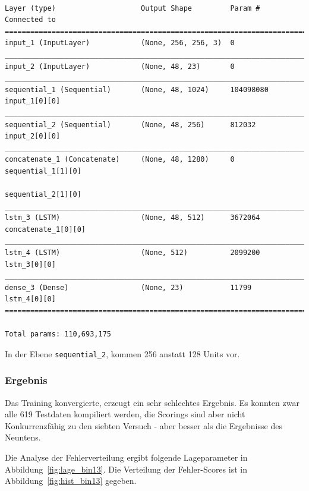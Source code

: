 \documentclass[pdftex,a4paper,halfparskip, article]{scrartcl}
\begin{document}
\begin{verbatim}

Layer (type)                    Output Shape         Param #     Connected to
==============================================================================
input_1 (InputLayer)            (None, 256, 256, 3)  0
______________________________________________________________________________
input_2 (InputLayer)            (None, 48, 23)       0
______________________________________________________________________________
sequential_1 (Sequential)       (None, 48, 1024)     104098080   input_1[0][0]
______________________________________________________________________________
sequential_2 (Sequential)       (None, 48, 256)      812032      input_2[0][0]
______________________________________________________________________________
concatenate_1 (Concatenate)     (None, 48, 1280)     0           sequential_1[1][0]
                                                                 sequential_2[1][0]
______________________________________________________________________________
lstm_3 (LSTM)                   (None, 48, 512)      3672064     concatenate_1[0][0]
______________________________________________________________________________
lstm_4 (LSTM)                   (None, 512)          2099200     lstm_3[0][0]
______________________________________________________________________________
dense_3 (Dense)                 (None, 23)           11799       lstm_4[0][0]
==============================================================================

Total params: 110,693,175
\end{verbatim}

In der Ebene \texttt{sequential\_2}, kommen 256 anstatt 128 Units vor.

\subsubsection*{Ergebnis}

Das Training konvergierte, erzeugt ein sehr schlechtes Ergebnis. Es konnten zwar alle 619 Testdaten kompiliert werden, die Scorings sind aber nicht Konkurrenzfähig zu den siebten Versuch - aber besser als die Ergebnisse des Neuntens.

Die Analyse der Fehlerverteilung ergibt folgende Lageparameter in Abbildung~\ref{fig:lage_bin13}. Die Verteilung der Fehler-Scores ist in Abbildung~\ref{fig:hist_bin13} gegeben.
\end{document}
